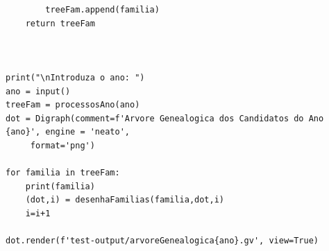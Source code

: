 \documentclass[11pt,a4paper]{report}
\begin{document}
\begin{verbatim}
        treeFam.append(familia)
    return treeFam



print("\nIntroduza o ano: ")
ano = input()
treeFam = processosAno(ano)
dot = Digraph(comment=f'Arvore Genealogica dos Candidatos do Ano {ano}', engine = 'neato',
	 format='png')

for familia in treeFam:
    print(familia)
    (dot,i) = desenhaFamilias(familia,dot,i)
    i=i+1

dot.render(f'test-output/arvoreGenealogica{ano}.gv', view=True)

\end{verbatim}
\end{document}
